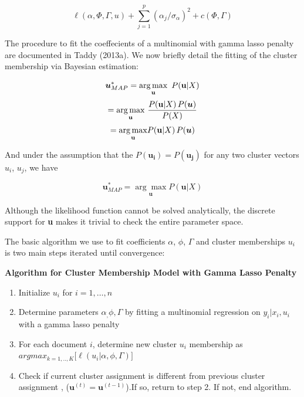 \documentclass[12pt]{article}
\begin{document}
\begin{equation}
\ell(\alpha,\Phi,\Gamma,u) + \sum_{j=1}^{p}(\alpha_j/ \sigma_\alpha)^2 + c(\Phi,\Gamma) 
\end{equation}


The procedure to fit the coeffecients of a multinomial with gamma lasso penalty are documented in Taddy (2013a). We now briefly detail the fitting of the cluster membership via Bayesian estimation:

\begin{equation}
\boldsymbol{u}^{*}_{MAP}  = \underset{\mathbf{u}}{\arg\max} \, \, \, P( \mathbf{u} | X) \\
\end{equation}
\begin{equation}
= \underset{\mathbf{u}}{\arg\max} \, \, \frac{P( \mathbf{u} | X) \, P(\boldsymbol{u})}{P(X)}    \\
\end{equation}
\begin{equation}
= \underset{\mathbf{u}}{\arg\max} P( \mathbf{u} | X) \, P(\boldsymbol{u})  \\
\end{equation}

And under the assumption that the $P(\boldsymbol{u_i}) = P(\boldsymbol{u_j})$ for any two cluster vectors $u_i$, $u_j$, we have

\begin{equation}
\boldsymbol{u}^{*}_{MAP} = \underset{\mathbf{u}}{\arg\max} P( \mathbf{u} | X)
\end{equation}


Although the likelihood function cannot be solved analytically, the discrete support for \textbf{u} makes it trivial to check the entire parameter space.


 The basic algorithm we use to fit coefficients $\alpha$, $\phi$, $\Gamma$
and cluster memberships $u_i$ is two main steps iterated until
convergence:

\textbf{Algorithm for Cluster Membership Model with Gamma Lasso Penalty}
\begin{enumerate}
\def\labelenumi{\arabic{enumi}.}
\item
 Initialize $u_i$ for $i = 1, \dots, n$
\item
  Determine parameters $\alpha_, \phi, \Gamma$ by fitting a multinomial
  regression on $y_i | x_i , u_i$ with a gamma lasso penalty
\item
  For each document $i$, determine new cluster $u_i$ membership as \\
  $argmax_{k = 1,..,K} \big[  \ell(u_i| \alpha, \phi, \Gamma) \big]$
\item 
Check if current cluster assignment is different from previous cluster assignment , ($\textbf{u}^{(t)}  = \textbf{u}^{(t-1)}$).If so, return to step 2. If not, end algorithm.
\end{enumerate}
\end{document}
